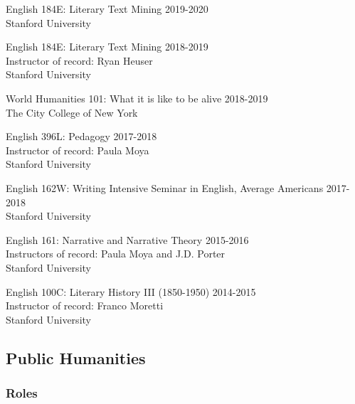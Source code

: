 \documentclass[
  12pt,
  letterpaper,
]{article}
\begin{document}
English 184E: Literary Text Mining \hfill 2019-2020\\
\hspace*{0.333em} Stanford University

English 184E: Literary Text Mining \hfill 2018-2019\\
\hspace*{0.333em} Instructor of record: Ryan Heuser\\
\hspace*{0.333em} Stanford University

World Humanities 101: What it is like to be alive \hfill 2018-2019\\
\hspace*{0.333em} The City College of New York

English 396L: Pedagogy \hfill 2017-2018\\
\hspace*{0.333em} Instructor of record: Paula Moya\\
\hspace*{0.333em} Stanford University

English 162W: Writing Intensive Seminar in English, Average Americans
\hfill 2017-2018\\
\hspace*{0.333em} Stanford University

English 161: Narrative and Narrative Theory \hfill 2015-2016\\
\hspace*{0.333em} Instructors of record: Paula Moya and J.D. Porter\\
\hspace*{0.333em} Stanford University

English 100C: Literary History III (1850-1950) \hfill 2014-2015\\
\hspace*{0.333em} Instructor of record: Franco Moretti\\
\hspace*{0.333em} Stanford University

\hypertarget{public-humanities}{%
\subsection{Public Humanities}\label{public-humanities}}

\hypertarget{roles}{%
\subsubsection{Roles}\label{roles}}
\end{document}

